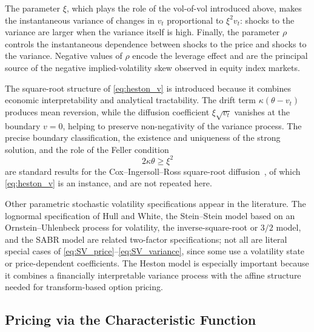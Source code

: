 The parameter $\xi$, which plays the role of the vol-of-vol introduced
above, makes the instantaneous variance of changes in $v_t$ proportional
to $\xi^2v_t$: shocks to the variance are larger when the variance itself
is high. Finally, the parameter $\rho$ controls the instantaneous
dependence between shocks to the price and shocks to the variance.
Negative values of $\rho$ encode the leverage effect and are the
principal source of the negative implied-volatility skew observed in
equity index markets.

The square-root structure of \eqref{eq:heston_v} is introduced because it
combines economic interpretability and analytical tractability. The drift
term $\kappa(\theta-v_t)$ produces mean reversion, while the diffusion
coefficient $\xi\sqrt{v_t}$ vanishes at the boundary $v=0$, helping to
preserve non-negativity of the variance process. The precise boundary
classification, the existence and uniqueness of the strong solution, and
the role of the Feller condition
\[
2\kappa\theta\geq \xi^2
\]
are standard results for the Cox--Ingersoll--Ross square-root
diffusion~\cite{CoxIngersollRoss1985}, of which \eqref{eq:heston_v} is an
instance, and are not repeated here.

\begin{remark}
Other parametric stochastic volatility specifications appear in the
literature. The lognormal specification of Hull and White, the
Stein--Stein model based on an Ornstein--Uhlenbeck process for
volatility, the inverse-square-root or $3/2$ model, and the SABR model
are related two-factor specifications; not all are literal special cases of \eqref{eq:SV_price}--\eqref{eq:SV_variance}, since some use a volatility state or price-dependent coefficients. The Heston model is
especially important because it combines a financially interpretable
variance process with the affine structure needed for transform-based
option pricing.
\end{remark}
\subsection{Pricing via the Characteristic Function}


